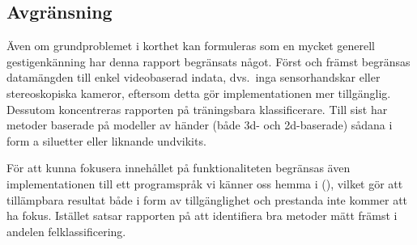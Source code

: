 \documentclass[../rapport_MVEX01-11-05]{subfiles}
\begin{document}
\subsection{Avgränsning}

Även om grundproblemet i korthet kan formuleras som en mycket generell
gestigenkänning har denna rapport begränsats något. Först och främst
begränsas datamängden till enkel videobaserad indata, dvs.~inga sensorhandskar
eller stereoskopiska kameror, eftersom detta gör implementationen mer
tillgänglig. Dessutom koncentreras rapporten på träningsbara
klassificerare. Till sist har metoder baserade på modeller av händer (både
3d- och 2d-baserade) sådana i form a siluetter eller liknande undvikits.

För att kunna fokusera innehållet på funktionaliteten begränsas även
implementationen till ett programspråk vi känner oss hemma i (\MATLAB), vilket gör att
tillämpbara resultat både i form av tillgänglighet och prestanda inte kommer
att ha fokus. Istället satsar rapporten på att identifiera bra metoder mätt
främst i andelen felklassificering.

\end{document}
